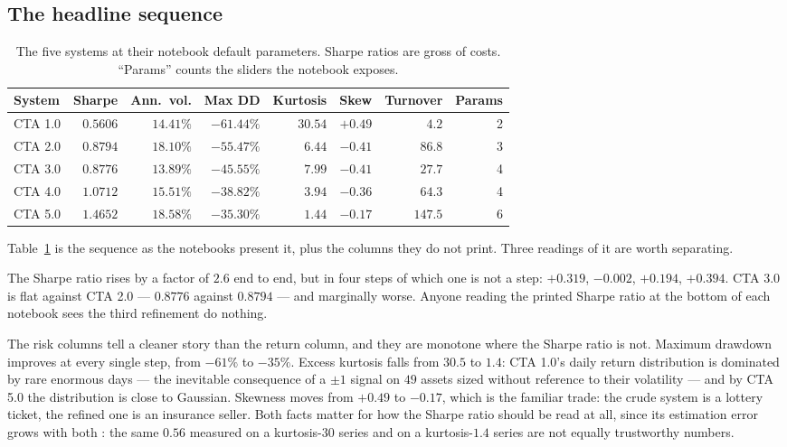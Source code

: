 \documentclass[11pt,a4paper]{article}
\begin{document}
\subsection{The headline sequence}

\begin{table}[t]
\centering
\caption{The five systems at their notebook default parameters. Sharpe ratios
are gross of costs. ``Params'' counts the sliders the notebook exposes.}
\label{tab:headline}
\begin{tabular}{lrrrrrrr}
\toprule
System & Sharpe & Ann.\ vol. & Max DD & Kurtosis & Skew & Turnover & Params \\
\midrule
CTA 1.0 & $0.5606$ & $14.41\%$ & $-61.44\%$ & $30.54$ & $+0.49$ & $4.2$   & 2 \\
CTA 2.0 & $0.8794$ & $18.10\%$ & $-55.47\%$ & $6.44$  & $-0.41$ & $86.8$  & 3 \\
CTA 3.0 & $0.8776$ & $13.89\%$ & $-45.55\%$ & $7.99$  & $-0.41$ & $27.7$  & 4 \\
CTA 4.0 & $1.0712$ & $15.51\%$ & $-38.82\%$ & $3.94$  & $-0.36$ & $64.3$  & 4 \\
CTA 5.0 & $1.4652$ & $18.58\%$ & $-35.30\%$ & $1.44$  & $-0.17$ & $147.5$ & 6 \\
\bottomrule
\end{tabular}
\end{table}

Table~\ref{tab:headline} is the sequence as the notebooks present it, plus the
columns they do not print. Three readings of it are worth separating.

The Sharpe ratio rises by a factor of $2.6$ end to end, but in four steps of
which one is not a step: $+0.319$, $-0.002$, $+0.194$, $+0.394$. CTA 3.0 is
flat against CTA 2.0 --- $0.8776$ against $0.8794$ --- and marginally worse.
Anyone reading the printed Sharpe ratio at the bottom of each notebook sees
the third refinement do nothing.

The risk columns tell a cleaner story than the return column, and they are
monotone where the Sharpe ratio is not. Maximum drawdown improves at every
single step, from $-61\%$ to $-35\%$. Excess kurtosis falls from $30.5$ to
$1.4$: CTA 1.0's daily return distribution is dominated by rare enormous days
--- the inevitable consequence of a $\pm 1$ signal on $49$ assets sized
without reference to their volatility --- and by CTA 5.0 the distribution is
close to Gaussian. Skewness moves from $+0.49$ to $-0.17$, which is the
familiar trade: the crude system is a lottery ticket, the refined one is an
insurance seller. Both facts matter for how the Sharpe ratio should be read at
all, since its estimation error grows with both \citep{lo2002}: the same
$0.56$ measured on a kurtosis-$30$ series and on a kurtosis-$1.4$ series are
not equally trustworthy numbers.
\end{document}
